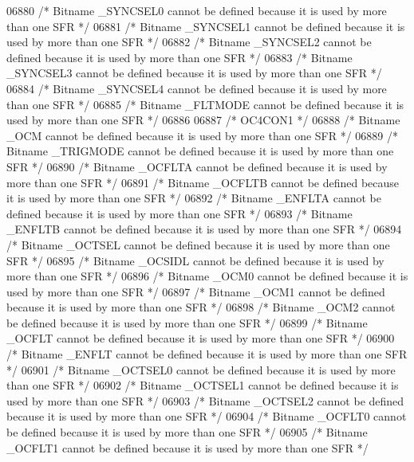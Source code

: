 \begin{DoxyCode}
06880 \textcolor{comment}{/* Bitname \_SYNCSEL0 cannot be defined because it is used by more than one SFR */}
06881 \textcolor{comment}{/* Bitname \_SYNCSEL1 cannot be defined because it is used by more than one SFR */}
06882 \textcolor{comment}{/* Bitname \_SYNCSEL2 cannot be defined because it is used by more than one SFR */}
06883 \textcolor{comment}{/* Bitname \_SYNCSEL3 cannot be defined because it is used by more than one SFR */}
06884 \textcolor{comment}{/* Bitname \_SYNCSEL4 cannot be defined because it is used by more than one SFR */}
06885 \textcolor{comment}{/* Bitname \_FLTMODE cannot be defined because it is used by more than one SFR */}
06886 
06887 \textcolor{comment}{/* OC4CON1 */}
06888 \textcolor{comment}{/* Bitname \_OCM cannot be defined because it is used by more than one SFR */}
06889 \textcolor{comment}{/* Bitname \_TRIGMODE cannot be defined because it is used by more than one SFR */}
06890 \textcolor{comment}{/* Bitname \_OCFLTA cannot be defined because it is used by more than one SFR */}
06891 \textcolor{comment}{/* Bitname \_OCFLTB cannot be defined because it is used by more than one SFR */}
06892 \textcolor{comment}{/* Bitname \_ENFLTA cannot be defined because it is used by more than one SFR */}
06893 \textcolor{comment}{/* Bitname \_ENFLTB cannot be defined because it is used by more than one SFR */}
06894 \textcolor{comment}{/* Bitname \_OCTSEL cannot be defined because it is used by more than one SFR */}
06895 \textcolor{comment}{/* Bitname \_OCSIDL cannot be defined because it is used by more than one SFR */}
06896 \textcolor{comment}{/* Bitname \_OCM0 cannot be defined because it is used by more than one SFR */}
06897 \textcolor{comment}{/* Bitname \_OCM1 cannot be defined because it is used by more than one SFR */}
06898 \textcolor{comment}{/* Bitname \_OCM2 cannot be defined because it is used by more than one SFR */}
06899 \textcolor{comment}{/* Bitname \_OCFLT cannot be defined because it is used by more than one SFR */}
06900 \textcolor{comment}{/* Bitname \_ENFLT cannot be defined because it is used by more than one SFR */}
06901 \textcolor{comment}{/* Bitname \_OCTSEL0 cannot be defined because it is used by more than one SFR */}
06902 \textcolor{comment}{/* Bitname \_OCTSEL1 cannot be defined because it is used by more than one SFR */}
06903 \textcolor{comment}{/* Bitname \_OCTSEL2 cannot be defined because it is used by more than one SFR */}
06904 \textcolor{comment}{/* Bitname \_OCFLT0 cannot be defined because it is used by more than one SFR */}
06905 \textcolor{comment}{/* Bitname \_OCFLT1 cannot be defined because it is used by more than one SFR */}

\end{DoxyCode}
